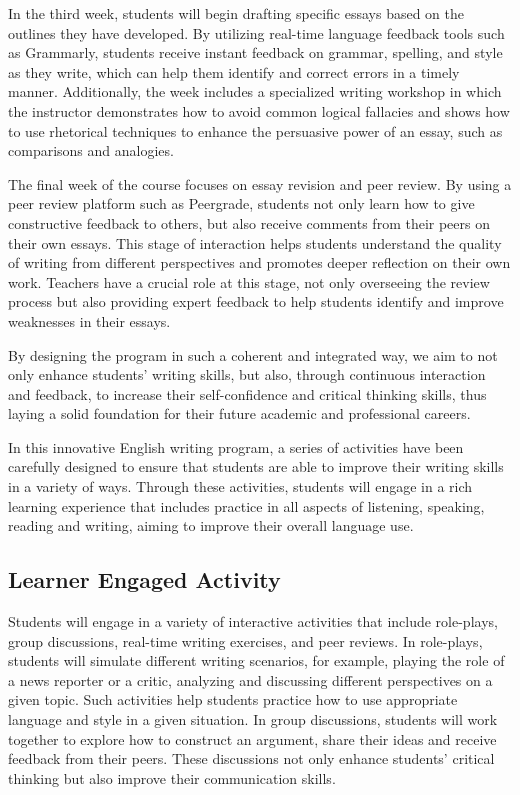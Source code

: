 \documentclass[11pt]{article}
\begin{document}
In the third week, students will begin drafting specific essays based on the outlines they have developed. By utilizing real-time language feedback tools such as Grammarly, students receive instant feedback on grammar, spelling, and style as they write, which can help them identify and correct errors in a timely manner. Additionally, the week includes a specialized writing workshop in which the instructor demonstrates how to avoid common logical fallacies and shows how to use rhetorical techniques to enhance the persuasive power of an essay, such as comparisons and analogies.

The final week of the course focuses on essay revision and peer review. By using a peer review platform such as Peergrade, students not only learn how to give constructive feedback to others, but also receive comments from their peers on their own essays. This stage of interaction helps students understand the quality of writing from different perspectives and promotes deeper reflection on their own work. Teachers have a crucial role at this stage, not only overseeing the review process but also providing expert feedback to help students identify and improve weaknesses in their essays.

By designing the program in such a coherent and integrated way, we aim to not only enhance students' writing skills, but also, through continuous interaction and feedback, to increase their self-confidence and critical thinking skills, thus laying a solid foundation for their future academic and professional careers.

In this innovative English writing program, a series of activities have been carefully designed to ensure that students are able to improve their writing skills in a variety of ways. Through these activities, students will engage in a rich learning experience that includes practice in all aspects of listening, speaking, reading and writing, aiming to improve their overall language use.

\subsection{Learner Engaged Activity}

Students will engage in a variety of interactive activities that include role-plays, group discussions, real-time writing exercises, and peer reviews. In role-plays, students will simulate different writing scenarios, for example, playing the role of a news reporter or a critic, analyzing and discussing different perspectives on a given topic. Such activities help students practice how to use appropriate language and style in a given situation. In group discussions, students will work together to explore how to construct an argument, share their ideas and receive feedback from their peers. These discussions not only enhance students' critical thinking but also improve their communication skills.
\end{document}
